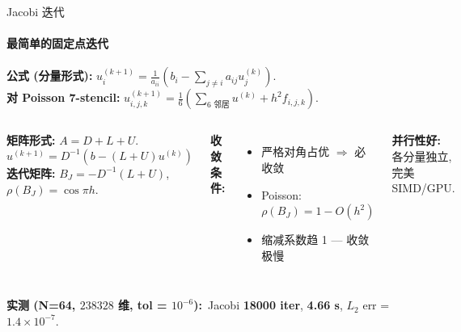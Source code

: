 \documentclass[12pt,aspectratio=169]{beamer}
\begin{document}
\begin{frame}[shrink]{Jacobi 迭代}
\framesubtitle{最简单的固定点迭代}

\footnotesize
\textbf{公式 (分量形式):} $u_i^{(k+1)} = \frac{1}{a_{ii}}(b_i - \sum_{j \ne i} a_{ij} u_j^{(k)})$. \\
\textbf{对 Poisson 7-stencil:} $u_{i,j,k}^{(k+1)} = \frac{1}{6}(\sum_{\text{6 邻居}} u^{(k)} + h^2 f_{i,j,k})$.

\vspace{4pt}
\begin{columns}[T]
\textbf{矩阵形式:} $A = D + L + U$.
\[
u^{(k+1)} = D^{-1}(b - (L+U) u^{(k)})
\]
\textbf{迭代矩阵:} $B_J = -D^{-1}(L+U)$, $\rho(B_J) = \cos\pi h$.

\textbf{收敛条件:}
\begin{itemize}\itemsep0pt
  \item 严格对角占优 $\Rightarrow$ 必收敛
  \item Poisson: $\rho(B_J) = 1 - O(h^2)$
  \item 缩减系数趋 1 — 收敛极慢
\end{itemize}

\textbf{并行性好:} 各分量独立, 完美 SIMD/GPU.
\end{columns}

\vspace{4pt}
\normalsize \textbf{实测 (N=64, $238328$ 维, tol = $10^{-6}$):} \,Jacobi \textbf{18000 iter}, \textbf{4.66 s}, $L_2$ err = $1.4\times 10^{-7}$.
\end{frame}
\end{document}
